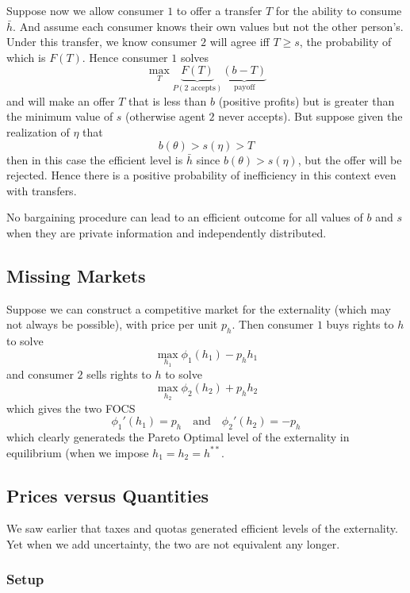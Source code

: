 Suppose now we allow consumer $1$ to offer a transfer $T$ for the
ability to consume $\bar h$. And assume each consumer knows their own
values but not the other person's. Under this transfer, we know
consumer $2$ will agree iff $T \geq s$, the probability of which is
$F(T)$. Hence consumer $1$ solves
\[
\max_T \underbrace{F(T)}_{P(\text{2 accepts})}
\underbrace{(b - T)}_{\text{payoff}}
\]
and will make an offer $T$ that is less than $b$ (positive profits)
but is greater than the minimum value of $s$ (otherwise agent $2$
never accepts). But suppose given the realization of $\eta$ that 
\[
b(\theta) > s(\eta) > T
\]
then in this case the efficient level is $\bar h$ since $b(\theta) >
s(\eta)$, but the offer will be rejected. Hence there is a positive
probability of inefficiency in this context even with transfers.

\begin{prop}
  No bargaining procedure can lead to an efficient outcome for all
  values of $b$ and $s$ when they are private information and
  independently distributed.
\end{prop}

\subsection{Missing Markets}
\label{sec:missing-markets}

Suppose we can construct a competitive market for the externality
(which may not always be possible), with price per unit $p_h$. Then
consumer $1$ buys rights to $h$ to solve
\[
\max_{h_1} \phi_1(h_1) - p_h h_1
\]
and consumer $2$ sells rights to $h$ to solve
\[
\max_{h_2} \phi_2(h_2) + p_h h_2
\]
which gives the two FOCS
\[
\phi_1'(h_1) = p_h \quad \text{and} \quad \phi_2'(h_2) = -p_h
\]
which clearly generateds the Pareto Optimal level of the externality
in equilibrium (when we impose $h_1 = h_2 = h^{**}$. 


\subsection{Prices versus Quantities}
\label{sec:pric-vers-quant}



We saw earlier that taxes and quotas generated efficient levels of the
externality. Yet when we add uncertainty, the two are not equivalent
any longer.

\subsubsection{Setup}


